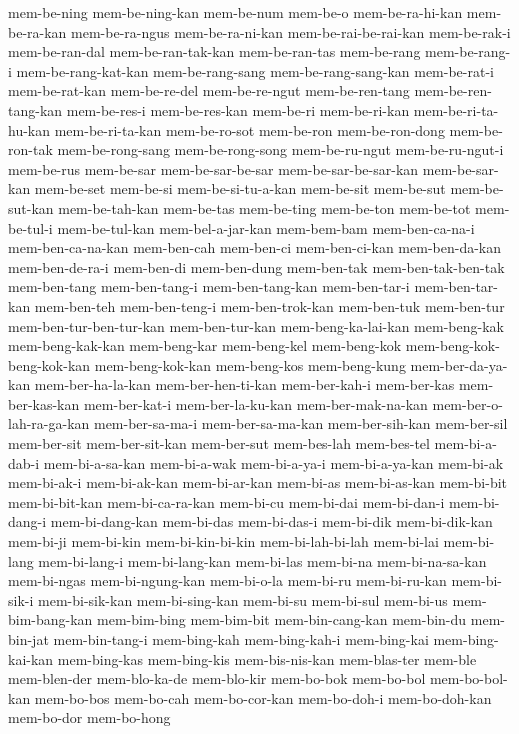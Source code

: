 {mem-be-ning mem-be-ning-kan mem-be-num mem-be-o mem-be-ra-hi-kan
mem-be-ra-kan mem-be-ra-ngus mem-be-ra-ni-kan mem-be-rai-be-rai-kan
mem-be-rak-i mem-be-ran-dal mem-be-ran-tak-kan mem-be-ran-tas mem-be-rang
mem-be-rang-i mem-be-rang-kat-kan mem-be-rang-sang mem-be-rang-sang-kan
mem-be-rat-i mem-be-rat-kan mem-be-re-del mem-be-re-ngut mem-be-ren-tang
mem-be-ren-tang-kan mem-be-res-i mem-be-res-kan mem-be-ri mem-be-ri-kan
mem-be-ri-ta-hu-kan mem-be-ri-ta-kan mem-be-ro-sot mem-be-ron
mem-be-ron-dong mem-be-ron-tak mem-be-rong-sang mem-be-rong-song
mem-be-ru-ngut mem-be-ru-ngut-i mem-be-rus mem-be-sar mem-be-sar-be-sar
mem-be-sar-be-sar-kan mem-be-sar-kan mem-be-set mem-be-si
mem-be-si-tu-a-kan mem-be-sit mem-be-sut mem-be-sut-kan mem-be-tah-kan
mem-be-tas mem-be-ting mem-be-ton mem-be-tot mem-be-tul-i mem-be-tul-kan
mem-bel-a-jar-kan mem-bem-bam mem-ben-ca-na-i mem-ben-ca-na-kan
mem-ben-cah mem-ben-ci mem-ben-ci-kan mem-ben-da-kan mem-ben-de-ra-i
mem-ben-di mem-ben-dung mem-ben-tak mem-ben-tak-ben-tak mem-ben-tang
mem-ben-tang-i mem-ben-tang-kan mem-ben-tar-i mem-ben-tar-kan mem-ben-teh
mem-ben-teng-i mem-ben-trok-kan mem-ben-tuk mem-ben-tur
mem-ben-tur-ben-tur-kan mem-ben-tur-kan mem-beng-ka-lai-kan mem-beng-kak
mem-beng-kak-kan mem-beng-kar mem-beng-kel mem-beng-kok
mem-beng-kok-beng-kok-kan mem-beng-kok-kan mem-beng-kos mem-beng-kung
mem-ber-da-ya-kan mem-ber-ha-la-kan mem-ber-hen-ti-kan mem-ber-kah-i
mem-ber-kas mem-ber-kas-kan mem-ber-kat-i mem-ber-la-ku-kan
mem-ber-mak-na-kan mem-ber-o-lah-ra-ga-kan mem-ber-sa-ma-i
mem-ber-sa-ma-kan mem-ber-sih-kan mem-ber-sil mem-ber-sit mem-ber-sit-kan
mem-ber-sut mem-bes-lah mem-bes-tel mem-bi-a-dab-i mem-bi-a-sa-kan
mem-bi-a-wak mem-bi-a-ya-i mem-bi-a-ya-kan mem-bi-ak mem-bi-ak-i
mem-bi-ak-kan mem-bi-ar-kan mem-bi-as mem-bi-as-kan mem-bi-bit
mem-bi-bit-kan mem-bi-ca-ra-kan mem-bi-cu mem-bi-dai mem-bi-dan-i
mem-bi-dang-i mem-bi-dang-kan mem-bi-das mem-bi-das-i mem-bi-dik
mem-bi-dik-kan mem-bi-ji mem-bi-kin mem-bi-kin-bi-kin mem-bi-lah-bi-lah
mem-bi-lai mem-bi-lang mem-bi-lang-i mem-bi-lang-kan mem-bi-las mem-bi-na
mem-bi-na-sa-kan mem-bi-ngas mem-bi-ngung-kan mem-bi-o-la mem-bi-ru
mem-bi-ru-kan mem-bi-sik-i mem-bi-sik-kan mem-bi-sing-kan mem-bi-su
mem-bi-sul mem-bi-us mem-bim-bang-kan mem-bim-bing mem-bim-bit
mem-bin-cang-kan mem-bin-du mem-bin-jat mem-bin-tang-i mem-bing-kah
mem-bing-kah-i mem-bing-kai mem-bing-kai-kan mem-bing-kas mem-bing-kis
mem-bis-nis-kan mem-blas-ter mem-ble mem-blen-der mem-blo-ka-de
mem-blo-kir mem-bo-bok mem-bo-bol mem-bo-bol-kan mem-bo-bos mem-bo-cah
mem-bo-cor-kan mem-bo-doh-i mem-bo-doh-kan mem-bo-dor mem-bo-hong
}
